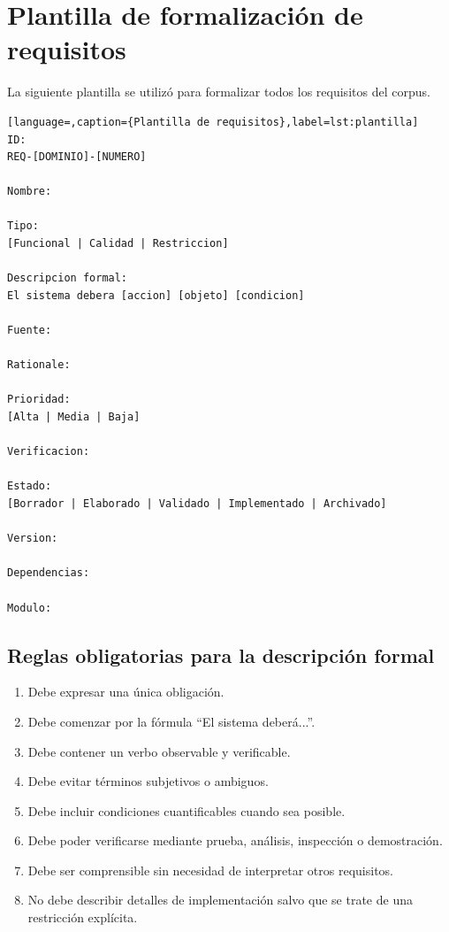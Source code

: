 \section{Plantilla de formalizaci\'on de requisitos}
\label{sec:anexo-plantilla}

La siguiente plantilla se utiliz\'o para formalizar todos los requisitos del corpus.

\begin{lstlisting}[language=,caption={Plantilla de requisitos},label=lst:plantilla]
ID:
REQ-[DOMINIO]-[NUMERO]

Nombre:

Tipo:
[Funcional | Calidad | Restriccion]

Descripcion formal:
El sistema debera [accion] [objeto] [condicion]

Fuente:

Rationale:

Prioridad:
[Alta | Media | Baja]

Verificacion:

Estado:
[Borrador | Elaborado | Validado | Implementado | Archivado]

Version:

Dependencias:

Modulo:
\end{lstlisting}

\subsection*{Reglas obligatorias para la descripci\'on formal}

\begin{enumerate}
    \item Debe expresar una \'unica obligaci\'on.
    \item Debe comenzar por la f\'ormula ``El sistema deber\'a...''.
    \item Debe contener un verbo observable y verificable.
    \item Debe evitar t\'erminos subjetivos o ambiguos.
    \item Debe incluir condiciones cuantificables cuando sea posible.
    \item Debe poder verificarse mediante prueba, an\'alisis, inspecci\'on o demostraci\'on.
    \item Debe ser comprensible sin necesidad de interpretar otros requisitos.
    \item No debe describir detalles de implementaci\'on salvo que se trate de una restricci\'on expl\'icita.
\end{enumerate}
